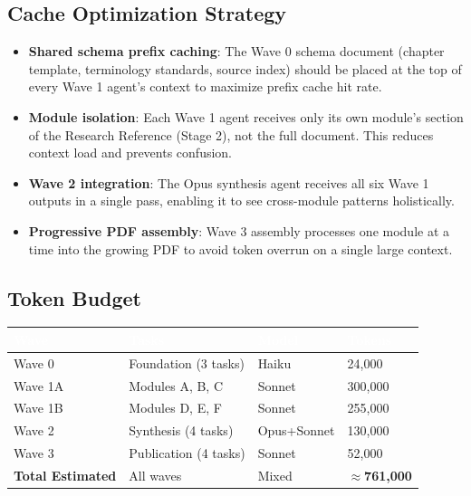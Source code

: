 \documentclass[11pt,letterpaper]{article}
\newcommand{\tableheader}[1]{\textbf{\sffamily\textcolor{white}{#1}}}
\begin{document}
\subsection{Cache Optimization Strategy}

\begin{itemize}[leftmargin=2em]
  \item \textbf{Shared schema prefix caching}: The Wave 0 schema document (chapter template, terminology standards, source index) should be placed at the top of every Wave 1 agent's context to maximize prefix cache hit rate.
  \item \textbf{Module isolation}: Each Wave 1 agent receives only its own module's section of the Research Reference (Stage 2), not the full document. This reduces context load and prevents confusion.
  \item \textbf{Wave 2 integration}: The Opus synthesis agent receives all six Wave 1 outputs in a single pass, enabling it to see cross-module patterns holistically.
  \item \textbf{Progressive PDF assembly}: Wave 3 assembly processes one module at a time into the growing PDF to avoid token overrun on a single large context.
\end{itemize}

\subsection{Token Budget}

\begin{center}
\begin{tabularx}{\textwidth}{L{4cm}XC{2cm}C{2cm}}
\toprule
{}
\tableheader{Wave} & \tableheader{Tasks} & \tableheader{Model} & \tableheader{Tokens} \\
\midrule
Wave 0 & Foundation (3 tasks) & Haiku & 24,000 \\
Wave 1A & Modules A, B, C & Sonnet & 300,000 \\
Wave 1B & Modules D, E, F & Sonnet & 255,000 \\
Wave 2 & Synthesis (4 tasks) & Opus+Sonnet & 130,000 \\
Wave 3 & Publication (4 tasks) & Sonnet & 52,000 \\
\midrule
{}
\textbf{Total Estimated} & All waves & Mixed & \textbf{$\approx$761,000} \\
\bottomrule
\end{tabularx}
\end{center}
\end{document}
